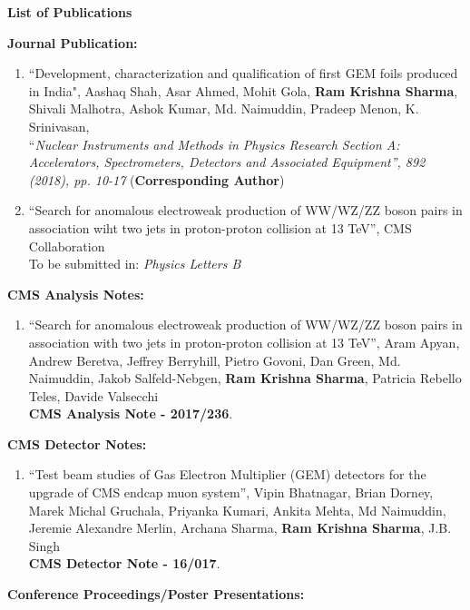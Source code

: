 \begin{center}
\doublespacing
{\LARGE \textbf{List of Publications}}
\end{center}
{\Large\textbf{Journal Publication:}}
\begin{enumerate}
\item ``Development, characterization and qualification of first GEM foils produced in India", Aashaq Shah, Asar Ahmed, Mohit Gola, \textbf{Ram Krishna Sharma}, Shivali Malhotra, Ashok Kumar, Md. Naimuddin, Pradeep Menon, K. Srinivasan,\\``\textit{Nuclear Instruments and Methods in Physics Research Section A: Accelerators, Spectrometers, Detectors and Associated Equipment'', 892 (2018), pp. 10-17} (\textbf{Corresponding Author})

\item ``Search for anomalous electroweak production of WW/WZ/ZZ boson pairs in association wiht two jets in proton-proton collision at 13 TeV'', CMS Collaboration\\To be submitted in: \textit{Physics Letters B}
\end{enumerate}
%
\vspace{0.3cm}
%
{\Large \textbf{CMS Analysis Notes:}}
\begin{enumerate}
\item ``Search for anomalous electroweak production of WW/WZ/ZZ boson pairs in association with two jets in proton-proton collision at 13 TeV'', 
Aram Apyan, Andrew Beretva, Jeffrey Berryhill, Pietro Govoni, Dan Green, Md. Naimuddin, Jakob Salfeld-Nebgen, \textbf{Ram Krishna Sharma}, Patricia Rebello Teles, Davide Valsecchi\\
{\bf CMS Analysis Note - 2017/236}.
\end{enumerate}
%
\vspace{0.3cm}
{\Large \textbf{CMS Detector Notes:}}
\begin{enumerate}
\item ``Test beam studies of Gas Electron Multiplier (GEM) detectors for the upgrade of CMS endcap muon system'', 
Vipin Bhatnagar, Brian Dorney, Marek Michal Gruchala, Priyanka Kumari, Ankita Mehta, Md Naimuddin, Jeremie Alexandre Merlin, Archana Sharma, \textbf{Ram Krishna Sharma}, J.B. Singh \\{\bf CMS Detector Note - 16/017}.
\end{enumerate}
%
\vspace{0.3cm}
{\Large \textbf{Conference Proceedings/Poster Presentations:}}
